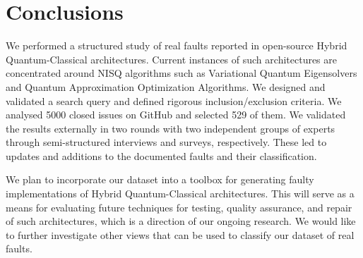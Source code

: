 \section{Conclusions}
\label{conclusion}

We performed a structured study of real faults reported in open-source Hybrid Quantum-Classical architectures. Current instances of such architectures are concentrated around NISQ algorithms such as  Variational Quantum Eigensolvers and
Quantum Approximation Optimization Algorithms. We designed and validated a search query and defined rigorous inclusion/exclusion criteria. We analysed
5000 closed issues on GitHub and selected 529 of them. 
 We validated the results externally in two rounds with two independent groups of experts through semi-structured interviews and surveys, respectively. These led to updates and additions to the documented faults and their classification. 


We plan to incorporate our dataset into a toolbox for generating faulty implementations of Hybrid Quantum-Classical architectures. This will serve as a means for evaluating future techniques for testing, quality assurance, and repair of such architectures, which is a direction of our ongoing research. We would like to further investigate other views that can be used to classify our dataset of real faults. \break

